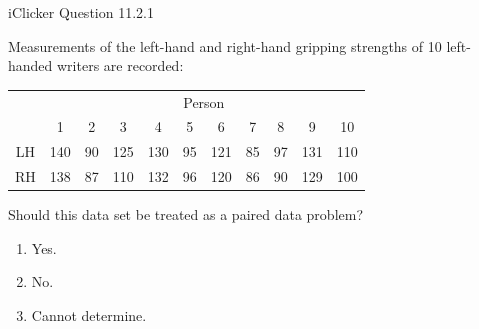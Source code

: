 \documentclass[14pt]{beamer}\usepackage[]{graphicx}\usepackage[]{color}
\begin{document}
\begin{frame}[fragile]{iClicker Question 11.2.1}

Measurements of the left-hand and right-hand gripping strengths of 10  left-handed writers are recorded:

\begin{table}[ht]
\centering
{\small{
\begin{tabular}{@{} ccccccccccc @{}} \hline
  & \multicolumn{10}{c}{Person} \\
  & 1 & 2 & 3 & 4 & 5 & 6 & 7 & 8 & 9 & 10 \\ \hline
LH & 140&90&125&130&95&121&85&97&131&110 \\
RH & 138&87&110&132&96&120&86&90&129&100 \\ \hline
\end{tabular}
}}
\end{table}

\vspace{3mm}

Should this data set be treated as a paired data problem?

\begin{enumerate}
\item Yes.
\item No.
\item Cannot determine.
\end{enumerate}
\end{frame}
\end{document}
